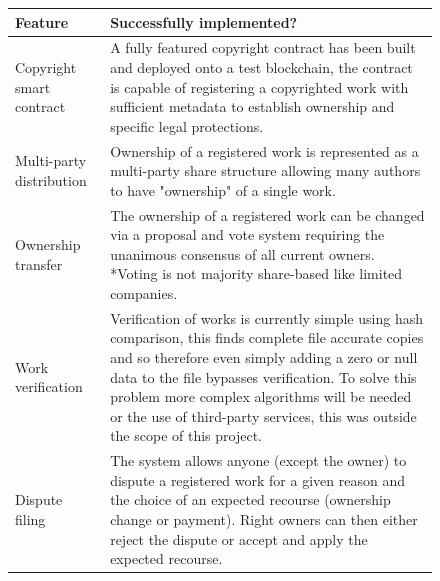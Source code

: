 \documentclass[12pt]{article}
\begin{document}
\begin{figure}[H]
\caption{success of each functional requirement}
\begin{table}[H]
\begin{tabular}{|p{}|p{}|}
\hline
Feature                         & Successfully implemented?                                                                                                                                                                                                                                                                                                                                                           \\ \hline
Copyright smart contract        & A fully featured copyright contract has been built and deployed onto a test blockchain, the contract is capable of registering a copyrighted work with sufficient metadata to establish ownership and specific legal protections.                                                                                                                                                   \\ \hline
Multi-party distribution        & Ownership of a registered work is represented as a multi-party share structure allowing many authors to have "ownership" of a single work.                                                                                                                                                                                                                                          \\ \hline
Ownership transfer              & The ownership of a registered work can be changed via a proposal and vote system requiring the unanimous consensus of all current owners. *Voting is not majority share-based like limited companies.                                                                                                                                                                               \\ \hline
Work verification               & Verification of works is currently simple using hash comparison, this finds complete file accurate copies and so therefore even simply adding a zero or null data to the file bypasses verification. To solve this problem more complex algorithms will be needed or the use of third-party services, this was outside the scope of this project.                                   \\ \hline
Dispute filing                  & The system allows anyone (except the owner) to dispute a registered work for a given reason and the choice of an expected recourse (ownership change or payment). Right owners can then either reject the dispute or accept and apply the expected recourse.                                                                                                                        \\ \hline

\end{tabular}
\end{table}
\end{figure}
\end{document}
